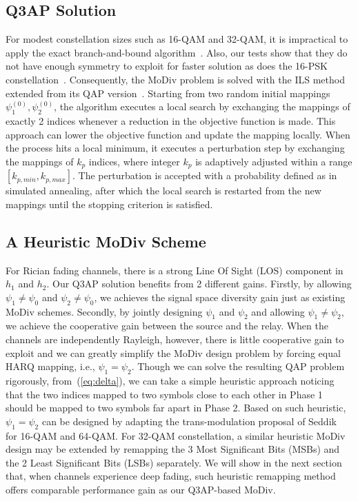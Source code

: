\documentclass[journal]{IEEEtran}
\begin{document}
\subsection{Q3AP Solution}
For modest constellation sizes such as 16-QAM and 32-QAM, it is impractical
to apply the exact branch-and-bound algorithm~\cite{hahn2008quadratic}. Also,
our tests show that they do not have enough symmetry to exploit for faster
solution as does the 16-PSK constellation~\cite{mittelmann2015solving}.
Consequently, the MoDiv problem is solved with the ILS
method~\cite{hahn2008quadratic} extended from its QAP
version~\cite{stutzle2006iterated}. Starting from two random initial mappings
$\psi_1^{(0)}, \psi_2^{(0)}$, the algorithm executes a local search by
exchanging the mappings of exactly 2 indices whenever a reduction in the
objective function is made. This approach can lower the objective function and
update the mapping locally. When the process hits a local minimum, it executes a
perturbation step by exchanging the mappings of $k_p$ indices, where integer
$k_p$ is adaptively adjusted within a range $[k_{p,min}, k_{p,max}]$. The
perturbation is accepted with a probability defined as in simulated annealing, after which the
local search is restarted from the new mappings until the stopping criterion is
satisfied.

\subsection{A Heuristic MoDiv Scheme}
\label{sec:heuristic}
For Rician fading channels, there is a strong Line Of Sight (LOS) component in
$h_1$ and $h_2$. Our Q3AP solution benefits from 2 different gains. Firstly, by
allowing $\psi_1\not=\psi_0$ and $\psi_2\not=\psi_0$, we achieves the signal
space diversity gain just as existing MoDiv schemes. Secondly, by jointly
designing $\psi_1$ and $\psi_2$ and allowing $\psi_1\not=\psi_2$, we achieve the
cooperative gain between the source and the relay. When the channels are
independently Rayleigh, however, there is little cooperative gain to exploit and
we can greatly simplify the MoDiv design problem by forcing equal HARQ mapping,
i.e., $\psi_1=\psi_2$.
Though we can solve the resulting QAP problem rigorously, from~(\ref{eq:delta}),
we can take a simple heuristic approach noticing that the two indices mapped to
two symbols close to each other in Phase 1 should be mapped to two symbols far
apart in Phase 2. Based on such heuristic, $\psi_1=\psi_2$ can be designed by
adapting the trans-modulation proposal of Seddik~\cite{seddik2008trans} for
16-QAM and 64-QAM. For 32-QAM constellation, a similar heuristic MoDiv design may be
extended by remapping the 3 Most Significant Bits (MSBs) and the 2 Least
Significant Bits (LSBs) separately. We will show in the next section that, when
channels experience deep fading, such heuristic remapping method offers
comparable performance gain as our Q3AP-based MoDiv.
\end{document}
